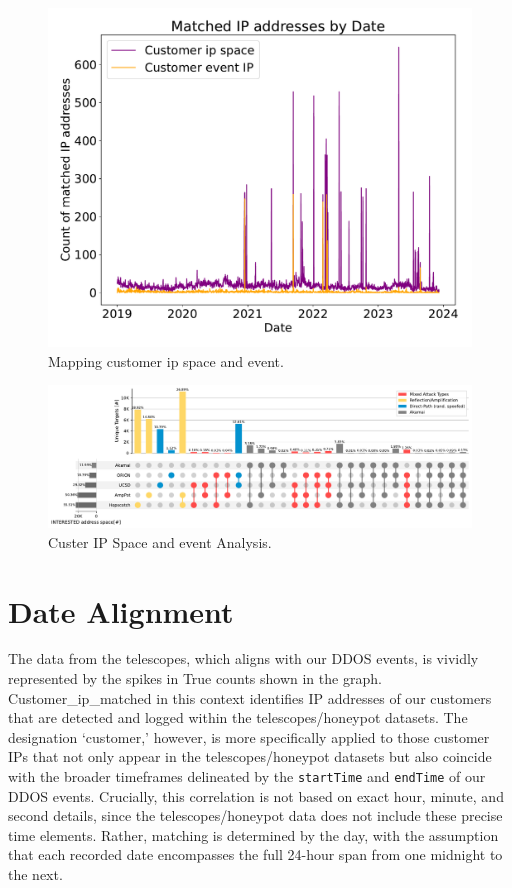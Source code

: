 \begin{figure}[htbp]
    \centering
    \includegraphics[scale=0.30]{graphs/matched_customer_graph.pdf}
    \caption{Mapping customer ip space and event.}
    \label{fig:mappedcustomergraph}
\end{figure}

\begin{figure}[htbp]
    \centering
    \includegraphics[scale=0.48]{graphs/noir3.pdf}
    \caption{Custer IP Space and event Analysis.}
    \label{fig:Mappedaddressanalysis}
\end{figure}

\section{Date Alignment}\label{sec:date_events_alignment}
The data from the telescopes, which aligns with our DDOS events, is vividly represented by the spikes in True counts shown in the graph. 
Customer\_ip\_matched in this context identifies IP addresses of our customers that are detected and logged within the telescopes/honeypot datasets. The designation `customer,' however, is more specifically applied to those customer IPs that not only appear in the telescopes/honeypot datasets but also coincide with the broader timeframes delineated by the \texttt{startTime} and \texttt{endTime} of our DDOS events. Crucially, this correlation is not based on exact hour, minute, and second details, since the telescopes/honeypot data does not include these precise time elements. Rather, matching is determined by the day, with the assumption that each recorded date encompasses the full 24-hour span from one midnight to the next.
